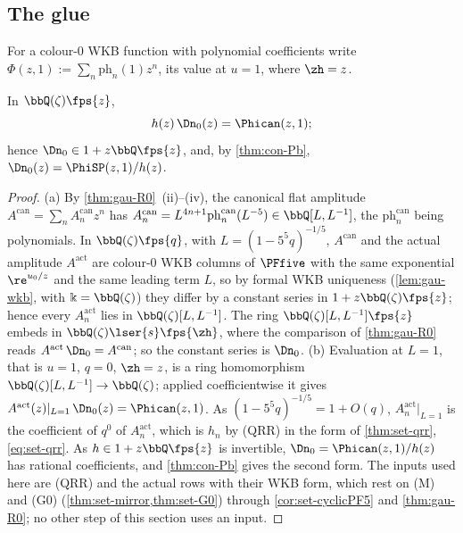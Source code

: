 
\subsection{The glue}
\label{sec:con-glue}

For a colour-$0$ WKB function with polynomial coefficients write $\Phi(z,1):=\sum_n\mathrm{ph}_n(1)z^n$, its value at $u=1$, where $\zh=z$.

\begin{thm}
\label{thm:con-glue}
In $\bbQ(\zeta)\fps{z}$,
\begin{equation}
\label{eq:con-glue}
h(z)\,\Dn_0(z)=\Phican(z,1);
\end{equation}
hence $\Dn_0\in1+z\bbQ\fps{z}$, and, by \cref{thm:con-Pb}, $\Dn_0(z)=\PhiSP(z,1)/h(z)$.
\end{thm}

\begin{proof}
(a) By \cref{thm:gau-R0}~(ii)--(iv), the canonical flat amplitude $A^{\mathrm{can}}=\sum_nA^{\mathrm{can}}_nz^n$ has $A^{\mathrm{can}}_n=L^{4n+1}\mathrm{ph}^{\mathrm{can}}_n(L^{-5})\in\bbQ[L,L^{-1}]$, the $\mathrm{ph}^{\mathrm{can}}_n$ being polynomials. In $\bbQ(\zeta)\fps{q}$, with $L=(1-5^5q)^{-1/5}$, $A^{\mathrm{can}}$ and the actual amplitude $A^{\mathrm{act}}$ are colour-$0$ WKB columns of $\PFfive$ with the same exponential $\re^{u_0/z}$ and the same leading term $L$, so by formal WKB uniqueness (\cref{lem:gau-wkb}, with $\Bbbk=\bbQ(\zeta)$) they differ by a constant series in $1+z\bbQ(\zeta)\fps{z}$; hence every $A^{\mathrm{act}}_n$ lies in $\bbQ(\zeta)[L,L^{-1}]$. The ring $\bbQ(\zeta)[L,L^{-1}]\fps{z}$ embeds in $\bbQ(\zeta)\lser{s}\fps{\zh}$, where the comparison of \cref{thm:gau-R0} reads $A^{\mathrm{act}}\,\Dn_0=A^{\mathrm{can}}$; so the constant series is $\Dn_0$. (b) Evaluation at $L=1$, that is $u=1$, $q=0$, $\zh=z$, is a ring homomorphism $\bbQ(\zeta)[L,L^{-1}]\to\bbQ(\zeta)$; applied coefficientwise it gives $A^{\mathrm{act}}(z)|_{L=1}\,\Dn_0(z)=\Phican(z,1)$. As $(1-5^5q)^{-1/5}=1+O(q)$, $A^{\mathrm{act}}_n|_{L=1}$ is the coefficient of $q^0$ of $A^{\mathrm{act}}_n$, which is $h_n$ by (QRR) in the form of \cref{thm:set-qrr}, \eqref{eq:set-qrr}. As $h\in1+z\bbQ\fps{z}$ is invertible, $\Dn_0=\Phican(z,1)/h(z)$ has rational coefficients, and \cref{thm:con-Pb} gives the second form. The inputs used here are (QRR) and the actual rows with their WKB form, which rest on (M) and (G0) (\cref{thm:set-mirror,thm:set-G0}) through \cref{cor:set-cyclicPF5} and \cref{thm:gau-R0}; no other step of this section uses an input.
\end{proof}

